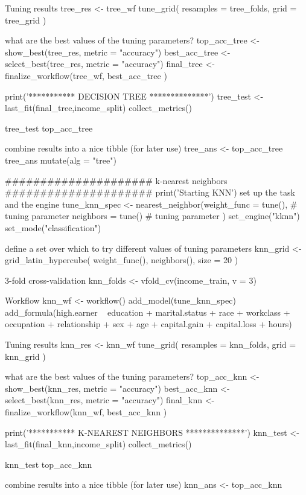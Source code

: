 \documentclass{article}
\begin{document}
Tuning results
tree_res <- tree_wf %
  tune_grid(
    resamples = tree_folds,
    grid = tree_grid
  )

what are the best values of the tuning parameters?
top_acc_tree  <- show_best(tree_res, metric = "accuracy")
best_acc_tree <- select_best(tree_res, metric = "accuracy")
final_tree <- finalize_workflow(tree_wf,
                                best_acc_tree
)

print('*********** DECISION TREE **************')
tree_test <- last_fit(final_tree,income_split) %
  collect_metrics()

tree_test %
top_acc_tree %

 combine results into a nice tibble (for later use)
tree_ans <- top_acc_tree %
tree_ans %
  mutate(alg = "tree") %

#####################
k-nearest neighbors
#####################
print('Starting KNN')
 set up the task and the engine
tune_knn_spec <- nearest_neighbor(weight_func = tune(), # tuning parameter
                                  neighbors = tune() # tuning parameter
) %
  set_engine("kknn") %
  set_mode("classification")

define a set over which to try different values of tuning parameters
knn_grid <- grid_latin_hypercube(
  weight_func(),
  neighbors(),
  size = 20
)

3-fold cross-validation
knn_folds <- vfold_cv(income_train, v = 3)

Workflow
knn_wf <- workflow() %
  add_model(tune_knn_spec) %
  add_formula(high.earner ~ education + marital.status + race + workclass + occupation + relationship + sex + age + capital.gain + capital.loss + hours)

Tuning results
knn_res <- knn_wf %
  tune_grid(
    resamples = knn_folds,
    grid = knn_grid
  )

what are the best values of the tuning parameters?
top_acc_knn  <- show_best(knn_res, metric = "accuracy")
best_acc_knn <- select_best(knn_res, metric = "accuracy")
final_knn <- finalize_workflow(knn_wf,
                               best_acc_knn
)

print('*********** K-NEAREST NEIGHBORS **************')
knn_test <- last_fit(final_knn,income_split) %
  collect_metrics()

knn_test %
top_acc_knn %

combine results into a nice tibble (for later use)
knn_ans <- top_acc_knn
\end{document}
